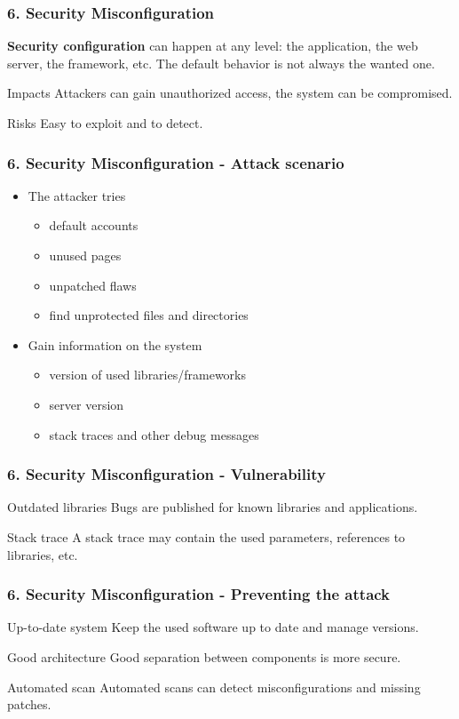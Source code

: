 \begin{frame}
\frametitle{6. Security Misconfiguration}
\textbf{Security configuration} can happen at any level: the application, the
web server, the framework, etc.
The default behavior is not always the wanted one.
\begin{block}{Impacts}
Attackers can gain unauthorized access, the system can be compromised.
\end{block}
\begin{block}{Risks}
\alert{Easy} to exploit and to detect.
\end{block}
\end{frame}

\begin{frame}
\frametitle{6. Security Misconfiguration - Attack scenario}
\begin{itemize}
\item The attacker tries
	\begin{itemize}
	\item default accounts
	\item unused pages
	\item unpatched flaws
	\item find unprotected files and directories %
	\end{itemize}
\item Gain information on the system
	\begin{itemize}
	\item version of used libraries/frameworks
	\item server version
	\item stack traces and other debug messages
	\end{itemize}
\end{itemize}
\end{frame}

\begin{frame}
\frametitle{6. Security Misconfiguration - Vulnerability}
\begin{block}{Outdated libraries}
Bugs are published for known libraries and applications.
\end{block}
\begin{exampleblock}{Stack trace}
A stack trace may contain the used parameters, references to libraries, etc.
\end{exampleblock}
\end{frame}

\begin{frame}
\frametitle{6. Security Misconfiguration - Preventing the attack}
\begin{block}{Up-to-date system}
Keep the used software up to date and manage versions. %
\end{block}
\begin{block}{Good architecture}
Good separation between components is more secure.
\end{block}
\begin{block}{Automated scan}
Automated scans can detect misconfigurations and missing patches.
\end{block}
\end{frame}

